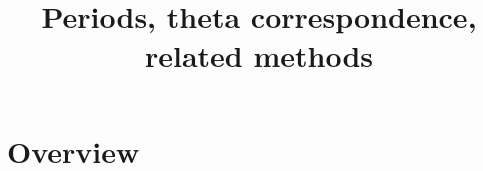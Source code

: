 

%


\title{Periods, theta correspondence, related methods}


\maketitle

\label{section-phantom}

\tableofcontents


\section{Overview}
\label{section-overview}








